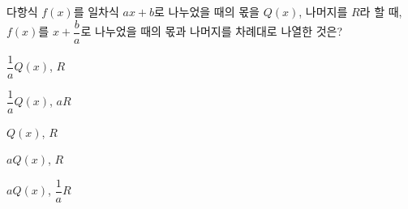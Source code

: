 다항식 $f(x)$를 일차식 $ax+b$로 나누었을 때의 몫을 $Q(x)$, 나머지를 $R$라 할 때, $f(x)$를 $x+\dfrac{b}{a}$로 나누었을 때의 몫과 나머지를 차례대로 나열한 것은? 
\begin{choicesii}{\rule[-3ex]{0pt}{8ex}$\dfrac{1}{a}Q(x)$, $R$}{\rule[-3ex]{0pt}{8ex}$\dfrac{1}{a}Q(x)$, $aR$}{\rule[-3ex]{0pt}{8ex}$Q(x)$, $R$}{\rule[-3ex]{0pt}{8ex}$aQ(x)$, $R$}{\rule[-3ex]{0pt}{8ex}$aQ(x)$, $\dfrac{1}{a}R$}\end{choicesii}
